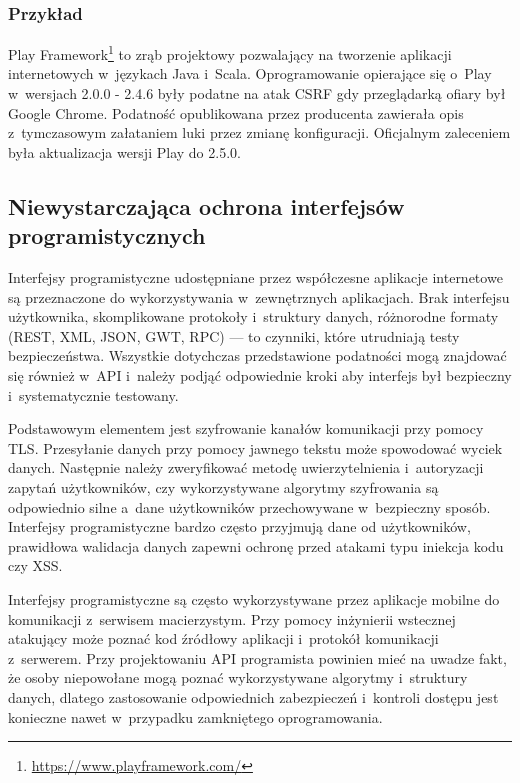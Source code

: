 \documentclass[12pt,a4paper,polish,thesis]{dcsbook}
\begin{document}
\subsubsection*{Przykład}
Play Framework\footnote{\url{https://www.playframework.com/}} to zrąb projektowy pozwalający na tworzenie aplikacji internetowych w~językach Java i~Scala. Oprogramowanie opierające się o~Play w~wersjach 2.0.0 - 2.4.6 były podatne na atak CSRF gdy przeglądarką ofiary był Google Chrome. Podatność opublikowana przez producenta \cite{playv1} zawierała opis z~tymczasowym załataniem luki przez zmianę konfiguracji. Oficjalnym zaleceniem była aktualizacja wersji Play do 2.5.0.

\subsection{Niewystarczająca ochrona interfejsów programistycznych}
Interfejsy programistyczne udostępniane przez współczesne aplikacje internetowe są przeznaczone do wykorzystywania w~zewnętrznych aplikacjach. Brak interfejsu użytkownika, skomplikowane protokoły i~struktury danych, różnorodne formaty (REST, XML, JSON, GWT, RPC) --- to czynniki, które utrudniają testy bezpieczeństwa. Wszystkie dotychczas przedstawione podatności mogą znajdować się również w~API i~należy podjąć odpowiednie kroki aby interfejs był bezpieczny i~systematycznie testowany.

Podstawowym elementem jest szyfrowanie kanałów komunikacji przy pomocy TLS. Przesyłanie danych przy pomocy jawnego tekstu może spowodować wyciek danych. Następnie należy zweryfikować metodę uwierzytelnienia i~autoryzacji zapytań użytkowników, czy wykorzystywane algorytmy szyfrowania są odpowiednio silne a~dane użytkowników przechowywane w~bezpieczny sposób. Interfejsy programistyczne bardzo często przyjmują dane od użytkowników, prawidłowa walidacja danych zapewni ochronę przed atakami typu iniekcja kodu czy XSS.

Interfejsy programistyczne są często wykorzystywane przez aplikacje mobilne do komunikacji z~serwisem macierzystym. Przy pomocy inżynierii wstecznej atakujący może poznać kod źródłowy aplikacji i~protokół komunikacji z~serwerem. Przy projektowaniu API programista powinien mieć na uwadze fakt, że osoby niepowołane mogą poznać wykorzystywane algorytmy i~struktury danych, dlatego zastosowanie odpowiednich zabezpieczeń i~kontroli dostępu jest konieczne nawet w~przypadku zamkniętego oprogramowania.
\end{document}

